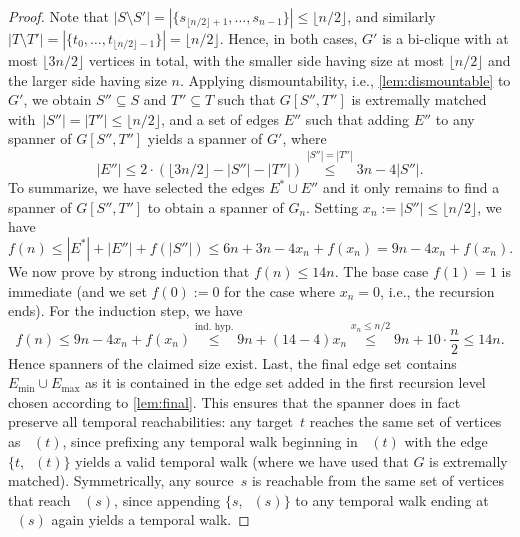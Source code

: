 \documentclass[10pt,a4paper]{amsart}
\DeclareMathOperator{\maxmat}{N_{\mathrm{max}}}
\DeclareMathOperator{\minmat}{N_{\mathrm{min}}}
\newcommand{\maxedges}{E_{\mathrm{max}}}
\newcommand{\minedges}{E_{\mathrm{min}}}
\renewcommand{\subset}{\subseteq}
\begin{document}
\begin{proof}
Note that $|S \setminus S'| = |\{s_{\lfloor n/2 \rfloor +1}, \dots, s_{n-1}\}| \leq \lfloor n/2 \rfloor$, and similarly $|T \setminus T'| = |\{t_0, \ldots, t_{\lfloor n/2 \rfloor -1}\}| = \lfloor n/2 \rfloor$.
Hence, in both cases, $G'$ is a bi-clique with at most $\lfloor 3n/2 \rfloor$ vertices in total, with the smaller side having size at most $\lfloor n/2 \rfloor$ and the larger side having size $n$.
Applying dismountability, i.e., \cref{lem:dismountable} to $G'$, we obtain $S''\subset S$ and $T''\subset T$ such that $G[S'',T'']$ is extremally matched with~$|S''|=|T''|\leq \lfloor n/2 \rfloor$, and a set of edges $E''$ such that adding $E''$ to any spanner of $G[S'',T'']$ yields a spanner of $G'$, where
\begin{equation*}
|E''|\leq 2\cdot (\lfloor 3n/2 \rfloor - |S''|-|T''|)
\overset{|S''|=|T''|}{\leq}3n - 4|S''|.
\end{equation*}
To summarize, we have selected the edges $E^*\cup E''$ and it only remains to find a spanner of $G[S'',T'']$ to obtain a spanner of $G_n$.
Setting $x_n := |S''| \leq \lfloor n/2 \rfloor$, we have
\begin{equation*}
f(n)\leq |E^*|+|E''|+f(|S''|)
\leq
6n + 3n - 4x_n + f(x_n)
=9n- 4x_n + f(x_n).
\end{equation*}
We now prove by strong induction that $f(n)\leq 14n$. The base case $f(1)=1$ is immediate (and we set $f(0):=0$ for the case where $x_n=0$, i.e., the recursion ends). For the induction step, we have
\begin{equation*}
f(n)\leq 9n-4x_n+f(x_n)
\overset{\text{ind.~hyp.}}{\leq} 9n + (14-4)x_n 
\overset{x_n\leq n/2}{\leq}
 9n + 10 \cdot \frac{n}{2} \leq 14n.
\end{equation*}
Hence spanners of the claimed size exist.
Last, the final edge set contains $\minedges \cup \maxedges$ as it is contained in the edge set added in the first recursion level chosen according to \cref{lem:final}. This ensures that the spanner does in fact preserve all temporal reachabilities: any target~$t$ reaches the same set of vertices as $\minmat(t)$, since prefixing any temporal walk beginning in $\minmat(t)$ with the edge $\{t, \minmat(t)\}$ yields a valid temporal walk (where we have used that $G$ is extremally matched). Symmetrically, any source~$s$ is reachable from the same set of vertices that reach $\maxmat(s)$, since appending $\{s, \maxmat(s)\}$ to any temporal walk ending at $\maxmat(s)$ again yields a temporal walk.
\end{proof}
\end{document}
